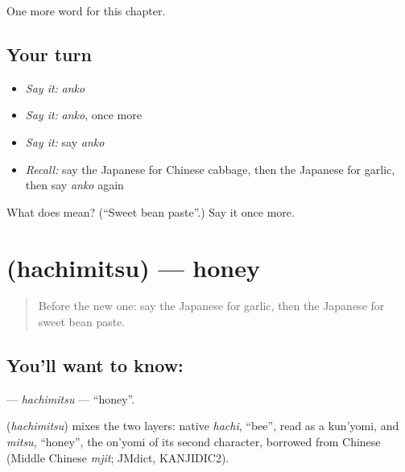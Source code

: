 \begin{grammarlens}[title={What you've built}]
One more word for this chapter.
\end{grammarlens}

\subsection*{Your turn}
\begin{itemize}
\raggedright
  \item \emph{Say it:} \emph{anko}
  \item \emph{Say it:} \emph{anko}, once more
  \item \emph{Say it:} say \emph{anko}
  \item \emph{Recall:} say the Japanese for Chinese cabbage, then the Japanese for garlic, then say \emph{anko} again
\end{itemize}

\begin{tcolorbox}[breakable,colback=teal!4,colframe=teal!35!black,title={Before you move on}]
What does  mean? (\textquotedblleft{}Sweet bean paste\textquotedblright{}.) Say it once more.
\end{tcolorbox}
\section[\texorpdfstring{\ja{はちみつ} (hachimitsu)}{はちみつ (hachimitsu)}]{ (hachimitsu) — honey}

\label{lesson:JA-C114-hachimitsu}



\begin{quote}
Before the new one: say the Japanese for garlic, then the Japanese for sweet bean paste.
\end{quote}

\subsection*{You'll want to know: }
\textbf{} — \emph{hachimitsu} — \textquotedblleft{}honey\textquotedblright{}.

\begin{cousinweb}
\textbf{} (\emph{hachimitsu}) mixes the two layers: native \emph{hachi}, \textquotedblleft{}bee\textquotedblright{}, read as a kun'yomi, and \emph{mitsu}, \textquotedblleft{}honey\textquotedblright{}, the on'yomi of its second character, borrowed from Chinese (Middle Chinese \emph{mjit}; JMdict, KANJIDIC2).
\end{cousinweb}

